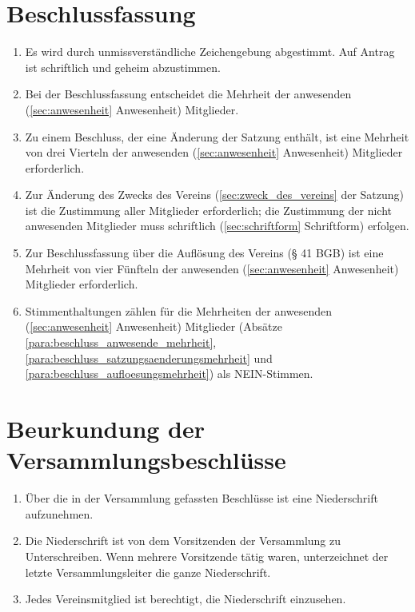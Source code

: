 \documentclass[a4paper]{article}
\begin{document}
\section{Beschlussfassung}\label{sec:beschlussfassung}

\begin{enumerate}
\item Es wird durch unmissverständliche Zeichengebung abgestimmt. Auf Antrag ist schriftlich und geheim abzustimmen.\label{para:beschluss_zeichen}
\item Bei der Beschlussfassung entscheidet die Mehrheit der anwesenden (\ref{sec:anwesenheit} Anwesenheit) Mitglieder.\label{para:beschluss_anwesende_mehrheit}
\item Zu einem Beschluss, der eine Änderung der Satzung enthält, ist eine Mehrheit von drei Vierteln der anwesenden (\ref{sec:anwesenheit} Anwesenheit) Mitglieder erforderlich.\label{para:beschluss_satzungsaenderungsmehrheit}
\item Zur Änderung des Zwecks des Vereins (\ref{sec:zweck_des_vereins} der Satzung) ist die Zustimmung aller Mitglieder erforderlich; die Zustimmung der nicht anwesenden Mitglieder muss schriftlich (\ref{sec:schriftform} Schriftform) erfolgen.\label{para:beschluss_zweckaenderungsmehrheit}
\item Zur Beschlussfassung über die Auflösung des Vereins (§ 41 BGB) ist eine Mehrheit von vier Fünfteln der anwesenden (\ref{sec:anwesenheit} Anwesenheit) Mitglieder erforderlich.\label{para:beschluss_aufloesungsmehrheit}
\item Stimmenthaltungen zählen für die Mehrheiten der anwesenden (\ref{sec:anwesenheit} Anwesenheit) Mitglieder (Absätze \ref{para:beschluss_anwesende_mehrheit}, \ref{para:beschluss_satzungsaenderungsmehrheit} und \ref{para:beschluss_aufloesungsmehrheit}) als NEIN-Stimmen.
\end{enumerate}


\section{Beurkundung der Versammlungsbeschlüsse}\label{sec:beurkundung_der_versammlungsbeschluesse}

\begin{enumerate}
\item Über die in der Versammlung gefassten Beschlüsse ist eine Niederschrift aufzunehmen.
\item Die Niederschrift ist von dem Vorsitzenden der Versammlung zu Unterschreiben. Wenn mehrere Vorsitzende tätig waren, unterzeichnet der letzte Versammlungsleiter die ganze Niederschrift.
\item Jedes Vereinsmitglied ist berechtigt, die Niederschrift einzusehen.

\end{enumerate}
\end{document}
